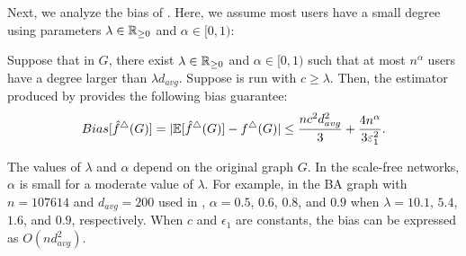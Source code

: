 Next, we analyze the bias of \AlgWSTriVR{}. Here, we assume most users have a small degree 
using parameters $\lambda \in \mathbb{R}_{\ge0}$ and $\alpha \in [0,1)$: 

\begin{theorem}
\label{thm:bias_II_ast}
  Suppose that in $G$, there exist $\lambda \in \mathbb{R}_{\ge0}$ and $\alpha \in [0,1)$
  such that at most $n^\alpha$ users have a degree larger than
  $\lambda d_{avg}$. Suppose \AlgWSTriVR{} is run with $c \geq \lambda$.
  Then, the estimator produced by
  \AlgWSTriVR{} provides the following bias guarantee:
\begin{align}
    Bias[\hat{f}^\triangle(G)]
    = |\mathbb{E}[\hat{f}^\triangle(G)] - f^\triangle(G)|
    \leq
    \frac{n c^2 d_{avg}^2}{3} +
    \frac{4 n^\alpha}{3 \varepsilon_1^2}.
    \label{eq:thm:bias_II_ast}
\end{align}
\end{theorem}
The values of $\lambda$ and $\alpha$ depend on the original graph $G$.
In the scale-free networks, $\alpha$ is small for a moderate value of $\lambda$.
For example, in the BA graph with $n=107614$ and $d_{avg}=200$ used in , $\alpha = 0.5$, $0.6$, $0.8$, and $0.9$ when $\lambda = 10.1$, $5.4$, $1.6$, and $0.9$, respectively.
When $c$ and $\epsilon_1$ are constants,
the bias can be expressed as $O(n d_{avg}^2)$.

